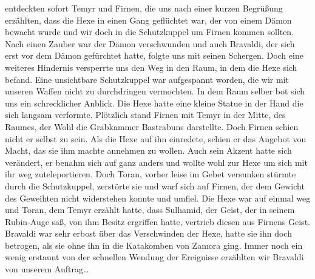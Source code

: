 entdeckten sofort Temyr und Firnen, die uns nach einer kurzen Begrüßung erzählten, dass die Hexe in einen Gang geflüchtet war, der von einem Dämon bewacht wurde und wir doch in die Schutzkuppel um Firnen kommen sollten. Nach einen Zauber war der Dämon verschwunden und auch Bravaldi, der sich erst vor dem Dämon gefürchtet hatte, folgte uns mit seinen Schergen. Doch eine weiteres Hindernis versperrte uns den Weg in den Raum, in dem die Hexe sich befand. Eine unsichtbare Schutzkuppel war aufgespannt worden, die wir mit unseren Waffen nicht zu durchdringen vermochten. In dem Raum selber bot sich uns ein schrecklicher Anblick. Die Hexe hatte eine kleine Statue in der Hand die sich langsam verformte. Plötzlich stand Firnen mit Temyr in der Mitte, des Raumes, der Wohl die Grabkammer Bastrabuns darstellte. Doch Firnen schien nicht er selbst zu sein. Als die Hexe auf ihn einredete, schien er das Angebot von Macht, das sie ihm machte annehmen zu wollen. Auch sein Akzent hatte sich verändert, er benahm sich auf ganz anders und wollte wohl zur Hexe um sich mit ihr weg zuteleportieren. Doch Toran, vorher leise im Gebet versunken stürmte durch die Schutzkuppel, zerstörte sie und warf sich auf Firnen, der dem Gewicht des Geweihten nicht widerstehen konnte und umfiel. Die Hexe war auf einmal weg und Toran, dem Temyr erzählt hatte, dass Sulhamid, der Geist, der in seinem Rubin-Auge saß, von ihm Besitz ergriffen hatte, vertrieb diesen aus Firnens Geist. Bravaldi war sehr erbost über das Verschwinden der Hexe, hatte sie ihn doch betrogen, als sie ohne ihn in die Katakomben von Zamora ging. Immer noch ein wenig erstaunt von der schnellen Wendung der Ereignisse erzählten wir Bravaldi von unserem Auftrag\dots

